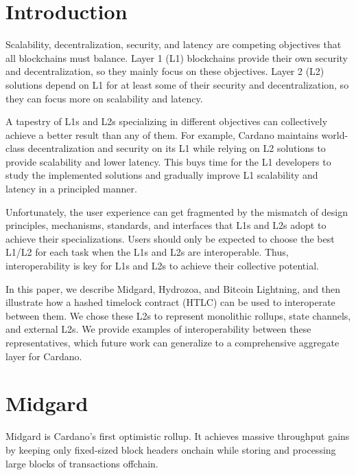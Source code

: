 \documentclass[11pt,a4paper,oneside]{article}
\begin{document}
\begin{multicols}{2}

\section{Introduction}%
\label{h:introduction}

Scalability, decentralization, security, and latency are competing objectives that all blockchains must balance.
Layer 1 (L1) blockchains provide their own security and decentralization, so they mainly focus on these objectives.
Layer 2 (L2) solutions depend on L1 for at least some of their security and decentralization, so they can focus more on scalability and latency.

A tapestry of L1s and L2s specializing in different objectives can collectively achieve a better result than any of them.
For example, Cardano maintains world-class decentralization and security on its L1 while relying on L2 solutions to provide scalability and lower latency.
This buys time for the L1 developers to study the implemented solutions and gradually improve L1 scalability and latency in a principled manner.

Unfortunately, the user experience can get fragmented by the mismatch of design principles, mechanisms, standards, and interfaces that L1s and L2s adopt to achieve their specializations.
Users should only be expected to choose the best L1/L2 for each task when the L1s and L2s are interoperable.
Thus, interoperability is key for L1s and L2s to achieve their collective potential.

In this paper, we describe Midgard, Hydrozoa, and Bitcoin Lightning, and then illustrate how a hashed timelock contract (HTLC) can be used to interoperate between them.
We chose these L2s to represent monolithic rollups, state channels, and external L2s.
We provide examples of interoperability between these representatives, which future work can generalize to a comprehensive aggregate layer for Cardano.

\section{Midgard}%
\label{h:midgard}

Midgard \citep{AnastasiaLabsMidgardCardanoLayer2024} is Cardano’s first optimistic rollup.
It achieves massive throughput gains by keeping only fixed-sized block headers onchain while storing and processing large blocks of transactions offchain.


\end{multicols}
\end{document}
